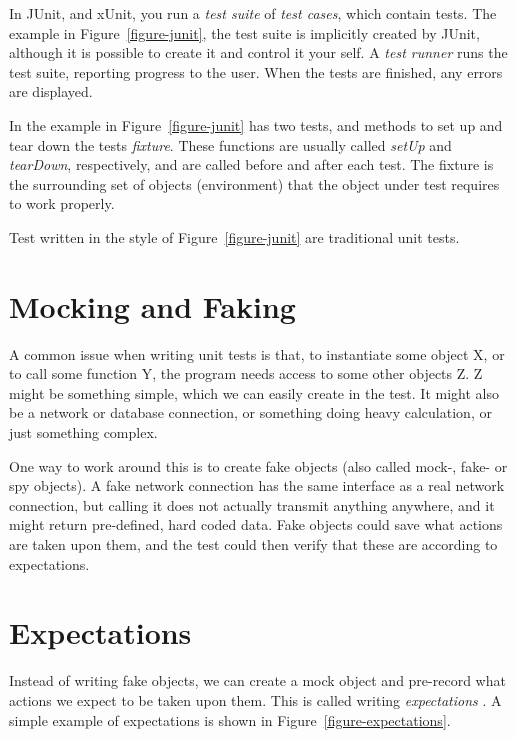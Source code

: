 \documentclass[a4paper,11pt]{kth-mag}
\theoremstyle{definition}
\begin{document}
In JUnit, and xUnit, you run a \textit{test suite} of \textit{test cases},
which contain tests. The example in Figure~\ref{figure-junit}, the test suite
is implicitly created by JUnit, although it is possible to create it and
control it your self. A \textit{test runner} runs the test suite, reporting
progress to the user. When the tests are finished, any errors are displayed.

In the example in Figure~\ref{figure-junit} has two tests, and methods to set
up and tear down the tests \textit{fixture}. These functions are usually called
\textit{setUp} and \textit{tearDown}, respectively, and are called before and
after each test. The fixture is the surrounding set of objects (environment)
that the object under test requires to work properly.

Test written in the style of Figure~\ref{figure-junit} are traditional unit
tests.


\section{Mocking and Faking} \label{section-mocking}

A common issue when writing unit tests is that, to instantiate some object X,
or to call some function Y, the program needs access to some other objects Z. Z
might be something simple, which we can easily create in the test. It might
also be a network or database connection, or something doing heavy calculation,
or just something complex.

One way to work around this is to create fake objects (also called mock-, fake-
or spy objects). A fake network connection has the same interface as a real
network connection, but calling it does not actually transmit anything
anywhere, and it might return pre-defined, hard coded data. Fake objects could
save what actions are taken upon them, and the test could then verify that
these are according to expectations.


\section{Expectations} \label{section-expectations}

Instead of writing fake objects, we can create a mock object and pre-record
what actions we expect to be taken upon them. This is called writing
\textit{expectations} \cite{fowler07expectations}. A simple example of
expectations is shown in Figure~\ref{figure-expectations}.
\end{document}
